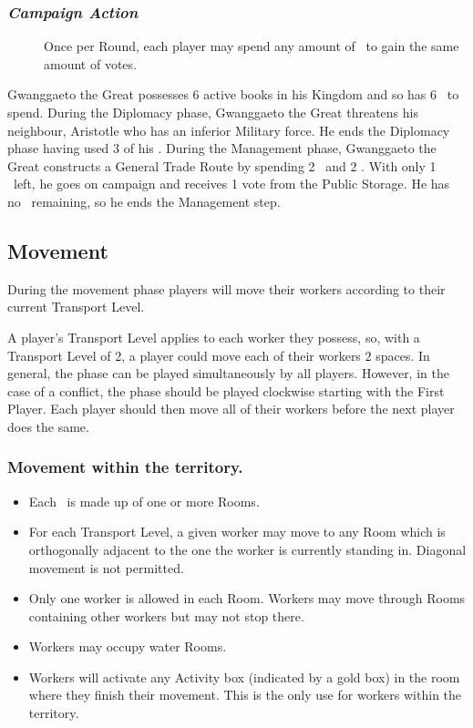 \documentclass[10pt,twocolumn]{article}
\begin{document}
\subsubsection*{\textit{Campaign Action}}
\begin{description}
\item[] Once per Round, each player may spend any amount of \polfs\ to gain the same amount of votes.
\end{description}
\begin{BoxExample}Gwanggaeto the Great possesses 6 active books in his Kingdom and so has 6 \polfs\ to spend. During the Diplomacy phase, Gwanggaeto the Great threatens his neighbour, Aristotle who has an inferior Military force. He ends the Diplomacy phase having used 3 of his \polf. During the Management phase, Gwanggaeto the Great constructs a General Trade Route by spending 2 \minerals\ and 2 \polfs. With only 1 \polf\ left, he goes on campaign and receives 1 vote from the Public Storage. He has no \polfs\ remaining, so he ends the Management step.\end{BoxExample}

\subsection{Movement}
During the movement phase players will move their workers according to their current Transport Level.


A player's Transport Level applies to each worker they possess, so, with a Transport Level of 2, a player could move each of their workers 2 spaces.
In general, the  phase can be played simultaneously by all players. However, in the case of a conflict, the phase should be played clockwise starting with the First Player. Each player should then move all of their workers before the next player does the same.

\subsubsection{Movement within the territory.}
\begin{itemize}
\item Each \landcard\ is made up of one or more Rooms.
\item For each Transport Level, a given worker may move to any Room which is orthogonally adjacent to the one the worker is currently standing in. Diagonal movement is not permitted.
\item Only one worker is allowed in each Room. Workers may move through Rooms containing other workers but may not stop there.
\item Workers may occupy water Rooms.
\item Workers will activate any Activity box (indicated by a gold box) in the room where they finish their movement. This is the only use for workers within the territory.
\end{itemize}
\end{document}
